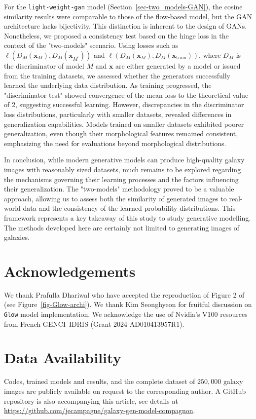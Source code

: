 \documentclass[fleqn,usenatbib]{mnras}
\begin{document}
For the \texttt{light-weight-gan} model (Section~\ref{sec-two_models-GAN}), the cosine similarity results were comparable to those of the flow-based model, but the GAN architecture lacks bijectivity. This distinction is inherent to the design of GANs. Nonetheless, we proposed a consistency test based on the hinge loss in the context of the "two-models" scenario. Using losses such as \(\ell(D_M(\bm{x}_M), D_M(\bm{x}_{M^\prime}))\) and \(\ell(D_M(\bm{x}_M), D_M(\bm{x}_{\text{train}}))\), where \(D_M\) is the discriminator of model \(M\) and $\bm{x}$ are either generated by a model or issued from the training datasets, we assessed whether the generators successfully learned the underlying data distribution. As training progressed, the "discriminator test" showed convergence of the mean loss to the theoretical value of 2, suggesting successful learning. However, discrepancies in the discriminator loss distributions, particularly with smaller datasets, revealed differences in generalization capabilities. Models trained on smaller datasets exhibited poorer generalization, even though their morphological features remained consistent, emphasizing the need for evaluations beyond morphological distributions.

In conclusion, while modern generative models can produce high-quality galaxy images with reasonably sized datasets, much remains to be explored regarding the mechanisms governing their learning processes and the factors influencing their generalization. The "two-models" methodology proved to be a valuable approach, allowing us to assess both the similarity of generated images to real-world data and the consistency of the learned probability distributions. This framework represents a key takeaway of this study to study generative modelling. The methods developed here are certainly not limited to generating images of galaxies.
%
\section*{Acknowledgements}
We thank Prafulla Dhariwal who have accepted the reproduction of Figure 2 of  \cite{Kingma2018} (see Figure~\ref{fig-Glow-archi}). We thank Kim Seonghyeon for fruitful discussion on \texttt{Glow} model implementation. We acknowledge the use of  Nvidia’s V100 resources from French GENCI–IDRIS (Grant 2024-AD010413957R1).

\section*{Data Availability}
Codes, trained models and results, and the complete dataset of $250,000$ galaxy images are publicly available on request to the corresponding author. A GitHub repository is also accompanying this article, see details at \url{https://github.com/jecampagne/galaxy-gen-model-compagnon}. 

  

\bsp	%
\label{lastpage}
\end{document}
